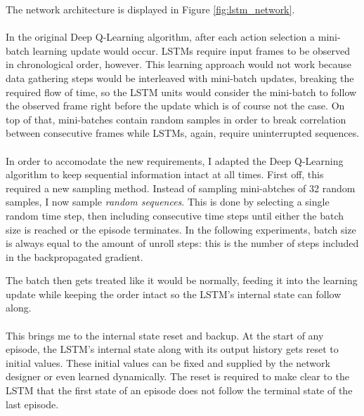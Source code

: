 The network architecture is displayed in Figure \ref{fig:lstm_network}.

\paragraph{}
In the original Deep Q-Learning algorithm,
after each action selection
a mini-batch learning update would occur.
LSTMs require input frames to be observed in chronological order, however.
This learning approach would not work
because data gathering steps would be interleaved with mini-batch updates,
breaking the required flow of time,
so the LSTM units
would consider the mini-batch to follow the observed frame right before the update
which is of course not the case.
On top of that, mini-batches contain random samples
in order to break correlation
between consecutive frames
while LSTMs, again, require uninterrupted sequences.

\paragraph{}
In order to accomodate the new requirements,
I adapted the Deep Q-Learning algorithm
to keep sequential information intact at all times.
First off,
this required a new sampling method.
Instead of sampling mini-abtches of 32 random samples,
I now sample \textit{random sequences}.
This is done by selecting a single random time step,
then including consecutive time steps
until either the batch size
is reached or the episode terminates.
In the following experiments,
batch size is always equal to
the amount of unroll steps:
this is the number of steps included
in the backpropagated gradient.

The batch then gets treated like it would be normally,
feeding it into the learning update while keeping the order intact
so the LSTM's internal state can follow along.

\paragraph{}
This brings me to the internal state reset and backup.
At the start of any episode,
the LSTM's internal state along with its output history
gets reset to initial values.
These initial values can be fixed and supplied
by the network designer
or even learned dynamically.
The reset is required to make clear to the LSTM
that the first state of an episode
does not follow the terminal state of the last episode.

